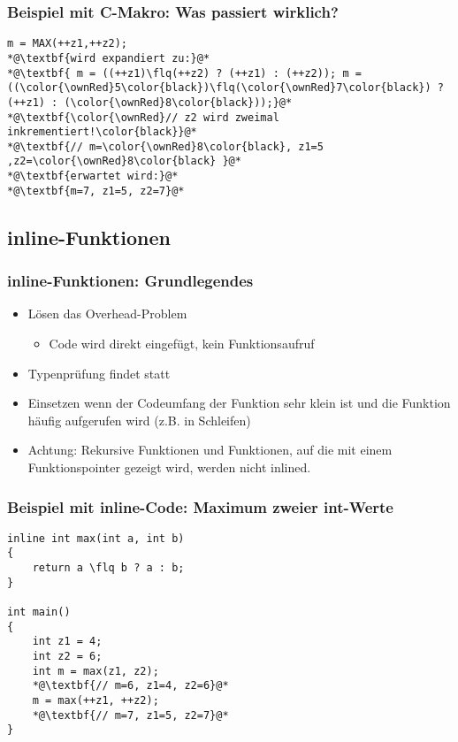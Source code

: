 \subsubsection{Beispiel mit C-Makro: Was passiert wirklich?\hfill}
\label{sec:Beispiel mit C-Makro: Was passiert wirklich?}
\noindent
\begin{minipage}{\linewidth}
\begin{lstlisting}
m = MAX(++z1,++z2);
*@\textbf{wird expandiert zu:}@*
*@\textbf{ m = ((++z1)\flq(++z2) ? (++z1) : (++z2)); m = ((\color{\ownRed}5\color{black})\flq(\color{\ownRed}7\color{black}) ? (++z1) : (\color{\ownRed}8\color{black}));}@*
*@\textbf{\color{\ownRed}// z2 wird zweimal inkrementiert!\color{black}}@*
*@\textbf{// m=\color{\ownRed}8\color{black}, z1=5 ,z2=\color{\ownRed}8\color{black} }@*
*@\textbf{erwartet wird:}@*
*@\textbf{m=7, z1=5, z2=7}@*
\end{lstlisting}
\end{minipage}


\subsection{inline-Funktionen\hfill}
\label{sec:inline-Funktionen}

\subsubsection{inline-Funktionen: Grundlegendes\hfill}
\label{sec:inline-Funktionen: Grundlegendes}
\begin{itemize}
	\item Lösen das Overhead-Problem
	\begin{itemize}
		\item Code wird direkt eingefügt, kein Funktionsaufruf
	\end{itemize}
	\item Typenprüfung findet statt
	\item Einsetzen wenn der Codeumfang der Funktion sehr klein ist und die Funktion häufig aufgerufen wird (z.B. in Schleifen)
	\item Achtung: Rekursive Funktionen und Funktionen, auf die mit einem Funktionspointer gezeigt wird, werden nicht inlined.
\end{itemize}

\subsubsection{Beispiel mit inline-Code: Maximum zweier int-Werte\hfill}
\label{sec:Beispiel mit inline-Code: Maximum zweier int-Werte}
\noindent
\begin{minipage}{\linewidth}
\begin{lstlisting}
inline int max(int a, int b)
{
	return a \flq b ? a : b;
}

int main()
{
	int z1 = 4;
	int z2 = 6;
	int m = max(z1, z2);
	*@\textbf{// m=6, z1=4, z2=6}@*
	m = max(++z1, ++z2);
	*@\textbf{// m=7, z1=5, z2=7}@*
}
\end{lstlisting}
\end{minipage}

